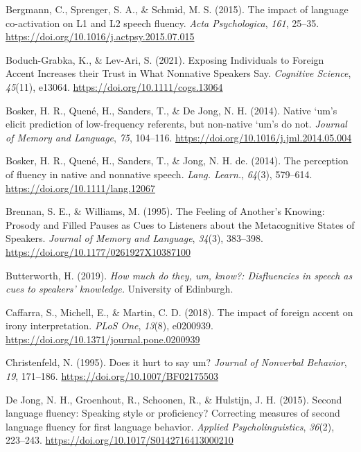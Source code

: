 \documentclass[
  man,floatsintext]{apa7}
\newlength{\cslhangindent}
\newlength{\cslentryspacingunit} %
\newenvironment{CSLReferences}[2] %
 {%
  \setlength{\parindent}{0pt}
  \ifodd #1
  \let\oldpar\par
  \def\par{\hangindent=\cslhangindent\oldpar}
  \fi
  \setlength{\parskip}{#2\cslentryspacingunit}
 }%
 {}
\begin{document}
\begin{CSLReferences}{1}{0}
\leavevmode{}%
Bergmann, C., Sprenger, S. A., \& Schmid, M. S. (2015). The impact of language co-activation on {L1} and {L2} speech fluency. \emph{Acta {Psychologica}}, \emph{161}, 25--35. \url{https://doi.org/10.1016/j.actpsy.2015.07.015}

\leavevmode{}%
Boduch-Grabka, K., \& Lev-Ari, S. (2021). Exposing {I}ndividuals to {F}oreign {A}ccent {I}ncreases their {T}rust in {W}hat {N}onnative {S}peakers {S}ay. \emph{Cognitive Science}, \emph{45}(11), e13064. \url{https://doi.org/10.1111/cogs.13064}

\leavevmode{}%
Bosker, H. R., Quené, H., Sanders, T., \& De Jong, N. H. (2014). Native `um's elicit prediction of low-frequency referents, but non-native `um's do not. \emph{Journal of Memory and Language}, \emph{75}, 104--116. \url{https://doi.org/10.1016/j.jml.2014.05.004}

\leavevmode{}%
Bosker, H. R., Quené, H., Sanders, T., \& Jong, N. H. de. (2014). The perception of fluency in native and nonnative speech. \emph{Lang. Learn.}, \emph{64}(3), 579--614. \url{https://doi.org/10.1111/lang.12067}

\leavevmode{}%
Brennan, S. E., \& Williams, M. (1995). The {F}eeling of {A}nother's {K}nowing: {P}rosody and {F}illed {P}auses as {C}ues to {L}isteners about the {M}etacognitive {S}tates of {S}peakers. \emph{Journal of Memory and Language}, \emph{34}(3), 383--398. \url{https://doi.org/10.1177/0261927X10387100}

\leavevmode{}%
Butterworth, H. (2019). \emph{How much do they, um, know?: Disfluencies in speech as cues to speakers' knowledge.} University of Edinburgh.

\leavevmode{}%
Caffarra, S., Michell, E., \& Martin, C. D. (2018). The impact of foreign accent on irony interpretation. \emph{{PLoS} One}, \emph{13}(8), e0200939. \url{https://doi.org/10.1371/journal.pone.0200939}

\leavevmode{}%
Christenfeld, N. (1995). Does it hurt to say um? \emph{Journal of Nonverbal Behavior}, \emph{19}, 171--186. \url{https://doi.org/10.1007/BF02175503}

\leavevmode{}%
De Jong, N. H., Groenhout, R., Schoonen, R., \& Hulstijn, J. H. (2015). Second language fluency: {S}peaking style or proficiency{?} {C}orrecting measures of second language fluency for first language behavior. \emph{Applied Psycholinguistics}, \emph{36}(2), 223--243. \url{https://doi.org/10.1017/S0142716413000210}


\end{CSLReferences}
\end{document}
